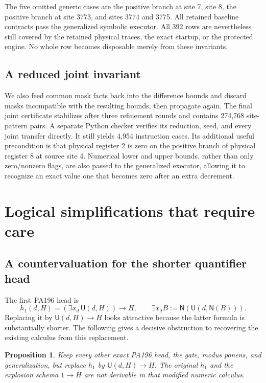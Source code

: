 \documentclass[11pt,letterpaper]{article}
\newtheorem{proposition}[theorem]{Proposition}
\newcommand{\U}{\mathsf U}
\newcommand{\Nn}{\mathsf N}
\begin{document}
The five omitted generic cases are the positive branch at site 7,
site 8, the positive branch at site 3773, and sites 3774 and 3775.
All retained baseline contracts pass the generalized symbolic executor.
All 392 rows are nevertheless still covered by the retained physical
traces, the exact startup, or the protected engine. No whole row becomes
disposable merely from these invariants.

\subsection{A reduced joint invariant}

We also feed common mask facts back into the difference bounds and
discard masks incompatible with the resulting bounds, then propagate
again. The final joint certificate stabilizes after three refinement
rounds and contains 274,768 site-pattern pairs. A separate Python
checker verifies its reduction, seed, and every joint transfer directly.
It still yields 4,954 instruction cases. Its additional useful
precondition is that physical register 2 is zero on the positive branch
of physical register 8 at source site 4. Numerical lower and upper
bounds, rather than only zero/nonzero flags, are also passed to the
generalized executor, allowing it to recognize an exact value one that
becomes zero after an extra decrement.

\section{Logical simplifications that require care}
\label{sec:obstructions}

\subsection{A countervaluation for the shorter quantifier head}

The first PA196 head is
\[
 h_1(d,H)=(\exists x_d\,\U(d,H))\to H,
 \qquad \exists x_d B:=\Nn(\U(d,\Nn(B))).
\]
Replacing it by $\U(d,H)\to H$ looks attractive because the latter
formula is substantially shorter. The following gives a decisive
obstruction to recovering the existing calculus from this replacement.

\begin{proposition}\label{prop:T}
Keep every other exact PA196 head, the gate, modus ponens, and
generalization, but replace $h_1$ by $\U(d,H)\to H$.
The original $h_1$ and the explosion schema $1\to H$ are not derivable
in that modified numeric calculus.
\end{proposition}
\end{document}
